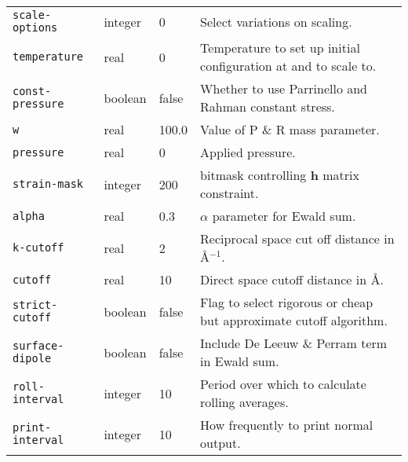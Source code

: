 \begin{table}
\begin{minipage}{\textwidth}
\begin{tabular}{|l|l|l|p{2.7in}|}
\verb'scale-options' &           integer &              0  &
Select variations on scaling. \\
\verb'temperature' &            real &                  0 &
Temperature to set up initial configuration at and to scale to. \\ \hline
\verb'const-pressure' &         boolean &               false  &
Whether to use Parrinello and Rahman constant stress. \\
\verb'w' &                      real &                  100.0 &
Value of P \& R mass parameter. \\
\verb'pressure' &               real &                  0 &
Applied pressure. \\
\verb'strain-mask' &            integer &               200 &
bitmask controlling $\bm{h}$ matrix constraint. \\ \hline
\verb'alpha' &                  real &                  0.3 &
$\alpha$ parameter for Ewald sum. \\
\verb'k-cutoff' &               real &                  2 &
Reciprocal space cut off distance in \AA$^{-1}$. \\
\verb'cutoff' &         real &                  10 &
Direct space cutoff distance in \AA. \\
\verb'strict-cutoff' &          boolean &               false &
Flag to select rigorous or cheap but approximate cutoff algorithm. \\
\verb'surface-dipole' & boolean &               false  &
Include De Leeuw \& Perram term in Ewald sum. \\ \hline
\verb'roll-interval' &          integer &               10 &
Period over which to calculate rolling averages. \\
\verb'print-interval' &         integer &               10 &
How frequently to print normal output. \\ \hline
\end{tabular}
\end{minipage}
\end{table}
